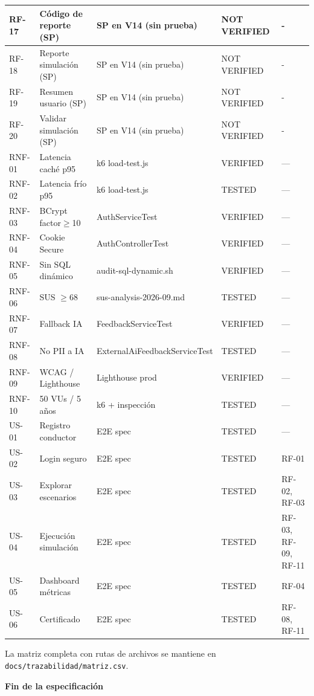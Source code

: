 \documentclass[11pt,a4paper]{article}
\begin{document}
\begin{longtable}{|p{1.6cm}|p{4.5cm}|p{3cm}|p{1.5cm}|p{2cm}|}
    RF-17 & Código de reporte (SP) & SP en V14 (sin prueba) & NOT VERIFIED & - \\ \hline
    RF-18 & Reporte simulación (SP) & SP en V14 (sin prueba) & NOT VERIFIED & - \\ \hline
    RF-19 & Resumen usuario (SP) & SP en V14 (sin prueba) & NOT VERIFIED & - \\ \hline
    RF-20 & Validar simulación (SP) & SP en V14 (sin prueba) & NOT VERIFIED & - \\ \hline
    RNF-01 & Latencia caché p95 & k6 load-test.js & VERIFIED & — \\ \hline
    RNF-02 & Latencia frío p95 & k6 load-test.js & TESTED & — \\ \hline
    RNF-03 & BCrypt factor$\geq$10 & AuthServiceTest & VERIFIED & — \\ \hline
    RNF-04 & Cookie Secure & AuthControllerTest & VERIFIED & — \\ \hline
    RNF-05 & Sin SQL dinámico & audit-sql-dynamic.sh & VERIFIED & — \\ \hline
    RNF-06 & SUS $\ge$68 & sus-analysis-2026-09.md & TESTED & — \\ \hline
    RNF-07 & Fallback IA & FeedbackServiceTest & VERIFIED & — \\ \hline
    RNF-08 & No PII a IA & ExternalAiFeedbackServiceTest & TESTED & — \\ \hline
    RNF-09 & WCAG / Lighthouse & Lighthouse prod & VERIFIED & — \\ \hline
    RNF-10 & 50 VUs / 5 años & k6 + inspección & TESTED & — \\ \hline
    US-01 & Registro conductor & E2E spec & TESTED & — \\ \hline
    US-02 & Login seguro & E2E spec & TESTED & RF-01 \\ \hline
    US-03 & Explorar escenarios & E2E spec & TESTED & RF-02, RF-03 \\ \hline
    US-04 & Ejecución simulación & E2E spec & TESTED & RF-03, RF-09, RF-11 \\ \hline
    US-05 & Dashboard métricas & E2E spec & TESTED & RF-04 \\ \hline
    US-06 & Certificado & E2E spec & TESTED & RF-08, RF-11 \\ \hline
\end{longtable}

La matriz completa con rutas de archivos se mantiene en \texttt{docs/trazabilidad/matriz.csv}.

\vspace{1cm}
\noindent\textbf{\Large Fin de la especificación}
\end{document}
